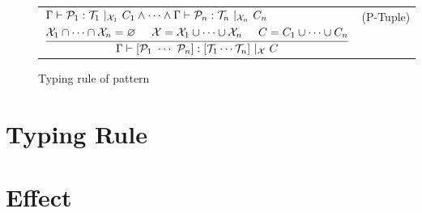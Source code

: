 \documentclass{article}
\begin{document}
\begin{figure}[tb]
\begin{tabular}{rlrl}
        \multicolumn{3}{r}{
        $\dfrac{
            \begin{aligned}
                &\Gamma \vdash \mathcal{P}_1 : \mathcal{T}_1\ |_{\mathcal{X}_1}\ C_1 \land \cdots \land
                    \Gamma \vdash \mathcal{P}_n : \mathcal{T}_n\ |_{\mathcal{X}_n}\ C_n \\
                &\mathcal{X}_1 \cap \cdots \cap \mathcal{X}_n = \varnothing \hspace{5mm}
                    \mathcal{X} = \mathcal{X}_1 \cup \cdots \cup \mathcal{X}_n \hspace{5mm}
                    C = C_1 \cup \cdots \cup C_n
            \end{aligned}
        }{
            \Gamma \vdash [\mathcal{P}_1\ \cdots\ \mathcal{P}_n] : [\mathcal{T}_1 \cdots \mathcal{T}_n]\ |_{\mathcal{X}}\ C
        }$} & (P-Tuple) \\
    \end{tabular}
    \caption{Typing rule of pattern}
\end{figure}

\section{Typing Rule}

\section{Effect}
\label{sec:effect}
\end{document}
